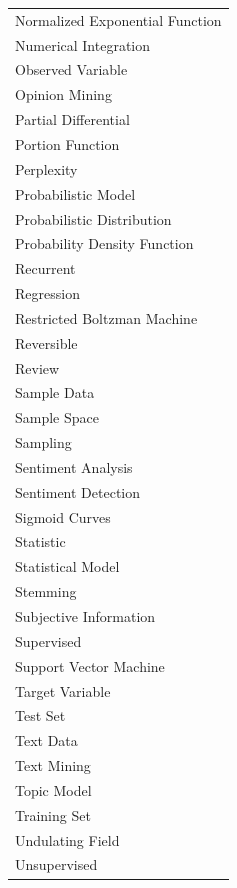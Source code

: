 \begin{table}[!t]
\begin{minipage}[c]{0.5\textwidth}
\begin{latin}
\begin{tabular}{l}
		Normalized Exponential Function\\ 
		Numerical Integration\\ 
		Observed Variable\\ 
		Opinion Mining\\ 
		Partial Differential\\ 
		Portion Function\\ 
		Perplexity\\ 
		Probabilistic Model\\ 
		Probabilistic Distribution\\ 
		Probability Density Function\\ 
		Recurrent\\
		Regression\\ 
		Restricted Boltzman Machine\\ 
		Reversible\\ 
		Review\\ 
		Sample Data\\ 
		Sample Space\\ 
		Sampling\\ 
		Sentiment Analysis\\ 
		Sentiment Detection\\ 
		Sigmoid Curves\\ 
		Statistic\\ 
		Statistical Model\\ 
		Stemming\\ 
		Subjective Information\\ 
		Supervised\\ 
		Support Vector Machine\\ 
		Target Variable\\ 
		Test Set\\ 
		Text Data\\ 
		Text Mining\\ 
		Topic Model\\ 
		Training Set\\ 
		Undulating Field\\ 
		Unsupervised\\
	\end{tabular}
\end{latin}
\end{minipage}
\end{table}



\titlespacing*{\chapter}{0pt}{3.5cm}{6cm}

